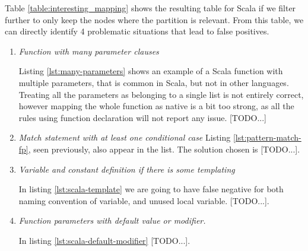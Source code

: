 Table \ref{table:interesting_mapping} shows the resulting table for Scala if we filter further to only keep the nodes where the partition is relevant. From this table, we can directly identify 4 problematic situations that lead to false positives.

\begin{enumerate}
	\item \textit{Function with many parameter clauses} \newline 
	
	
	Listing \ref{lst:many-parameters} shows an example of a Scala function with multiple parameters, that is common in Scala, but not in other languages. 
	Treating all the parameters as belonging to a single list is not entirely correct, however  mapping the whole function as native is a bit too strong, as all the rules using function declaration will not report any issue.
	[TODO...]
	
	\item \textit{Match statement with at least one conditional case} \newline 
	Listing \ref{lst:pattern-match-fp}, seen previously, also appear in the list. The solution chosen is 
	[TODO...].
	
	\item \textit{Variable and constant definition if there is some templating} \newline 
	
	
	In listing \ref{lst:scala-template} we are going to have false negative for both naming convention of variable, and unused local variable. 
	[TODO...].
	
	\item \textit{Function parameters with default value or modifier.} \newline 
	
	
	In listing \ref{lst:scala-default-modifier}
	[TODO...].
\end{enumerate}

